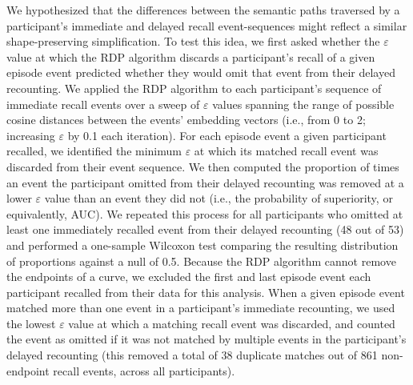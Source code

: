 \documentclass[10pt]{article}
\begin{document}
We hypothesized that the differences between the semantic paths traversed by a participant's immediate and delayed recall event-sequences might reflect a similar shape-preserving simplification.
To test this idea, we first asked whether the $\varepsilon$ value at which the RDP algorithm discards a participant's recall of a given episode event predicted whether they would omit that event from their delayed recounting.
We applied the RDP algorithm to each participant's sequence of immediate recall events over a sweep of $\varepsilon$ values spanning the range of possible cosine distances between the events' embedding vectors (i.e., from 0 to 2; increasing $\varepsilon$ by 0.1 each iteration).
For each episode event a given participant recalled, we identified the minimum $\varepsilon$ at which its matched recall event was discarded from their event sequence.
We then computed the proportion of times an event the participant omitted from their delayed recounting was removed at a lower $\varepsilon$ value than an event they did not (i.e., the probability of superiority, or equivalently, AUC).
We repeated this process for all participants who omitted at least one immediately recalled event from their delayed recounting (48 out of 53) and performed a one-sample Wilcoxon test comparing the resulting distribution of proportions against a null of 0.5. Because the RDP algorithm cannot remove the endpoints of a curve, we excluded the first and last episode event each participant recalled from their data for this analysis. 
When a given episode event matched more than one event in a participant's immediate recounting, we used the lowest $\varepsilon$ value at which a matching recall event was discarded, and counted the event as omitted if it was not matched by multiple events in the participant's delayed recounting (this removed a total of 38 duplicate matches out of 861 non-endpoint recall events, across all participants).
\end{document}
